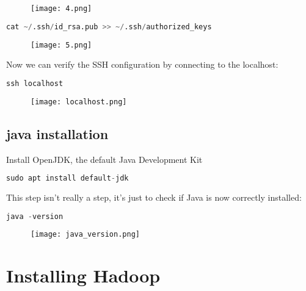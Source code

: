 \documentclass[onecolumn]{article}
\begin{document}
\begin{figure}[ht!]
\centering
\texttt{[image: 4.png]}
\caption{\label{}}
\end{figure}


\begin{lstlisting}[language=Python, caption= ssh-keygen]
cat ~/.ssh/id_rsa.pub >> ~/.ssh/authorized_keys
\end{lstlisting}

\begin{figure}[ht!]
\centering
\texttt{[image: 5.png]}
\caption{\label{}}
\end{figure}



Now we can verify the SSH configuration by connecting to the localhost:

\begin{lstlisting}[language=Python, caption= ssh local host]
ssh localhost
\end{lstlisting}

\begin{figure}[ht!]
\centering
\texttt{[image: localhost.png]}
\caption{\label{}}
\end{figure}

\subsection{java installation}

Install OpenJDK, the default Java Development Kit
\begin{lstlisting}[language=Python, caption= jdk]
sudo apt install default-jdk
\end{lstlisting}



This step isn’t really a step, it’s just to check if Java is now correctly installed:

\begin{lstlisting}[language=Python, caption= version check]
java -version
\end{lstlisting}

\begin{figure}[ht!]
\centering
\texttt{[image: java\_version.png]}
\caption{\label{}}
\end{figure}


\section{Installing Hadoop}
\end{document}
